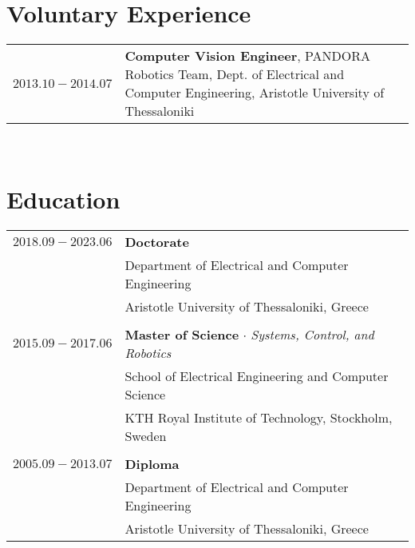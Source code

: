 \documentclass[a4paper,10pt,twoside]{article}
\begin{document}
\section{Voluntary Experience}

\begin{tabular}{rp{12cm}}
$2013.10 - 2014.07$ & \textbf{Computer Vision Engineer}, PANDORA Robotics Team,
Dept. of Electrical and Computer Engineering, Aristotle University of Thessaloniki \\
\end{tabular} \\



\section{Education}

\begin{tabular}{rp{12cm}}
$2018.09 - 2023.06$ & \textbf{Doctorate} \\
                    & Department of Electrical and Computer Engineering\\
                    & Aristotle University of Thessaloniki, Greece \\
&\\
$2015.09 - 2017.06$ & \textbf{Master of Science} $\cdot$ \textit{Systems, Control, and Robotics}\\
                    & School of Electrical Engineering and Computer Science\\
                    & KTH Royal Institute of Technology, Stockholm, Sweden\\
&\\
$2005.09 - 2013.07$ & \textbf{Diploma}\\
                    & Department of Electrical and Computer Engineering\\
                    & Aristotle University of Thessaloniki, Greece \\
\end{tabular}\\
\end{document}
